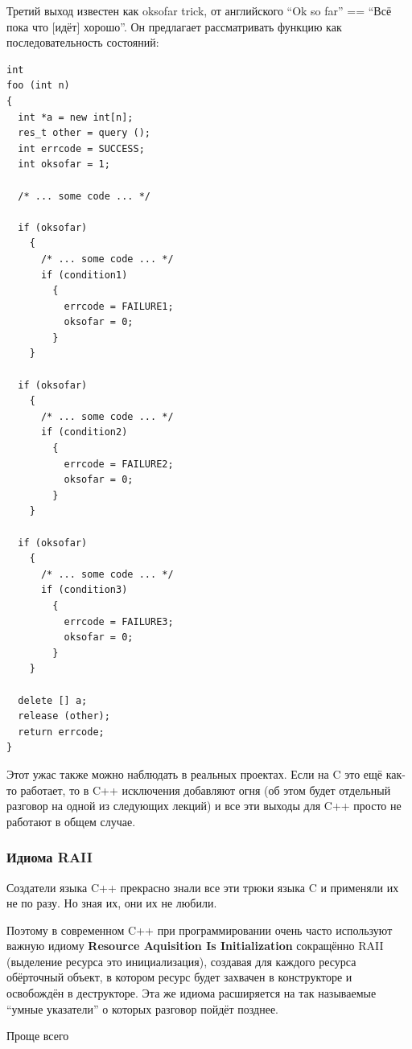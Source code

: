 \documentclass[a4paper,12pt,oneside]{article}
\begin{document}
Третий выход известен как oksofar trick, от английского ``Ok so far'' == ``Всё пока что [идёт] хорошо''. Он предлагает рассматривать функцию как последовательность состояний:

\begin{lstlisting}
int
foo (int n)
{
  int *a = new int[n];
  res_t other = query ();
  int errcode = SUCCESS;
  int oksofar = 1;

  /* ... some code ... */

  if (oksofar)
    {
      /* ... some code ... */
      if (condition1)
        {
          errcode = FAILURE1;
          oksofar = 0;
        }
    }

  if (oksofar)
    {
      /* ... some code ... */
      if (condition2)
        {
          errcode = FAILURE2;
          oksofar = 0;
        }
    }

  if (oksofar)
    {
      /* ... some code ... */
      if (condition3)
        {
          errcode = FAILURE3;
          oksofar = 0;
        }
    }

  delete [] a;
  release (other);
  return errcode;
}

\end{lstlisting}

Этот ужас также можно наблюдать в реальных проектах.
Если на C это ещё как-то работает, то в C++ исключения добавляют огня (об этом будет отдельный разговор на одной из следующих лекций) и все эти выходы для C++ просто не работают в общем случае.

\subsubsection{Идиома RAII}\label{RAII}

Создатели языка C++ прекрасно знали все эти трюки языка C и применяли их не по разу. Но зная их, они их не любили. 

Поэтому в современном C++ при программировании очень часто используют важную идиому \textbf{Resource Aquisition Is Initialization} сокращённо RAII (выделение ресурса это инициализация), создавая для каждого ресурса обёрточный объект, в котором ресурс будет захвачен в конструкторе и освобождён в деструкторе. Эта же идиома расширяется на так называемые ``умные указатели'' о которых разговор пойдёт позднее.

Проще всего
\end{document}
